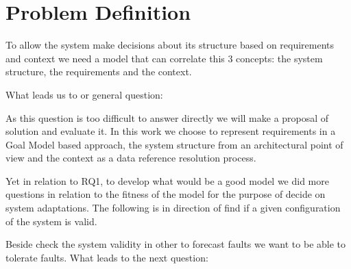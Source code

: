 \section{Problem Definition}


To allow the system make decisions about its structure based on requirements and context we need a model that can correlate this 3 concepts: the system structure, the requirements and the context.

What leads us to or general question:


\setlength{\fboxsep}{10pt}
\noindent{}\bigskip

As this question is too difficult to answer directly we will make a proposal of solution and evaluate it. In this work we choose to represent requirements in a Goal Model based approach, the system structure from an architectural point of view and the context as a data reference resolution process.


\setlength{\fboxsep}{10pt}
\noindent{}\bigskip

Yet in relation to RQ1, to develop what would be a good model we did more questions in relation to the fitness of the model for the purpose of decide on system adaptations. The following is in direction of find if a given configuration of the system is valid.

\setlength{\fboxsep}{10pt}
\noindent{}\bigskip

Beside check the system validity in other to forecast faults we want to be able to tolerate faults. What leads to the next question:

